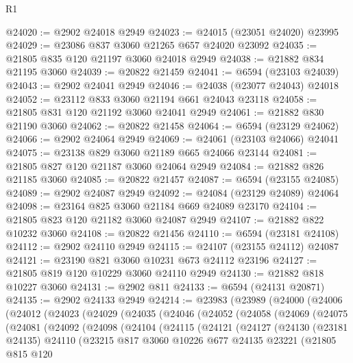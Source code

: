 \begin{lexlean}{R1}
\begin{coremodule}
@24020 := @2902 @24018 @2949
@24023 := @24015 (@23051 @24020) @23995
@24029 := @23086 @837 @3060 @21265 @657 @24020 @23092
@24035 := @21805 @835 @120 @21197 @3060 @24018 @2949
@24038 := @21882 @834 @21195 @3060
@24039 := @20822 @21459
@24041 := @6594 (@23103 @24039)
@24043 := @2902 @24041 @2949
@24046 := @24038 (@23077 @24043) @24018
@24052 := @23112 @833 @3060 @21194 @661 @24043 @23118
@24058 := @21805 @831 @120 @21192 @3060 @24041 @2949
@24061 := @21882 @830 @21190 @3060
@24062 := @20822 @21458
@24064 := @6594 (@23129 @24062)
@24066 := @2902 @24064 @2949
@24069 := @24061 (@23103 @24066) @24041
@24075 := @23138 @829 @3060 @21189 @665 @24066 @23144
@24081 := @21805 @827 @120 @21187 @3060 @24064 @2949
@24084 := @21882 @826 @21185 @3060
@24085 := @20822 @21457
@24087 := @6594 (@23155 @24085)
@24089 := @2902 @24087 @2949
@24092 := @24084 (@23129 @24089) @24064
@24098 := @23164 @825 @3060 @21184 @669 @24089 @23170
@24104 := @21805 @823 @120 @21182 @3060 @24087 @2949
@24107 := @21882 @822 @10232 @3060
@24108 := @20822 @21456
@24110 := @6594 (@23181 @24108)
@24112 := @2902 @24110 @2949
@24115 := @24107 (@23155 @24112) @24087
@24121 := @23190 @821 @3060 @10231 @673 @24112 @23196
@24127 := @21805 @819 @120 @10229 @3060 @24110 @2949
@24130 := @21882 @818 @10227 @3060
@24131 := @2902 @811
@24133 := @6594 (@24131 @20871)
@24135 := @2902 @24133 @2949
@24214 := @23983
    (@23989
      (@24000
        (@24006
          (@24012
            (@24023
              (@24029
                (@24035
                  (@24046
                    (@24052
                      (@24058
                        (@24069
                          (@24075
                            (@24081
                              (@24092
                                (@24098
                                  (@24104
                                    (@24115
                                      (@24121
                                        (@24127
                                          (@24130
                                            (@23181 @24135)
                                            @24110
                                            (@23215
                                              @817
                                              @3060
                                              @10226
                                              @677
                                              @24135
                                              @23221
                                              (@21805
                                                @815
                                                @120

\end{coremodule}
\end{lexlean}
